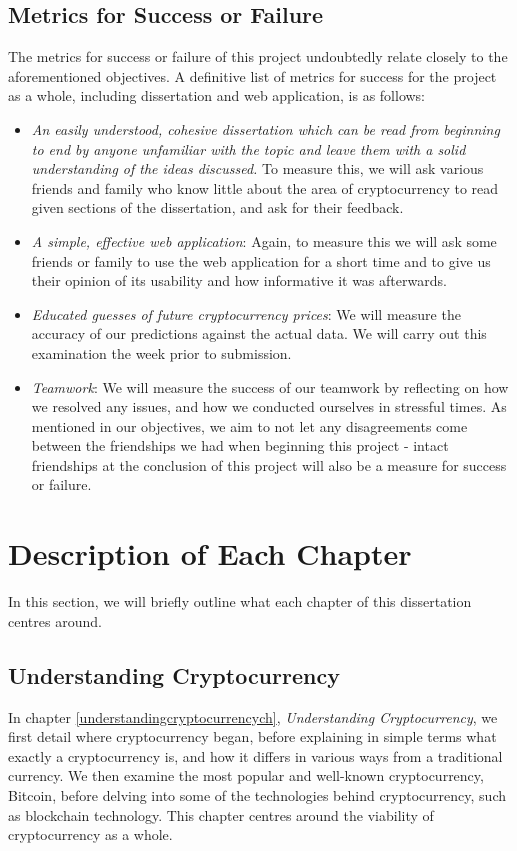 \subsection{Metrics for Success or Failure}\label{metrics}
The metrics for success or failure of this project undoubtedly relate closely to the aforementioned objectives. A definitive list of metrics for success for the project as a whole, including dissertation and web application, is as follows:

\begin{itemize}
    \item\textit{An easily understood, cohesive dissertation which can be read from beginning to end by anyone unfamiliar with the topic and leave them with a solid understanding of the ideas discussed.} To measure this, we will ask various friends and family who know little about the area of cryptocurrency to read given sections of the dissertation, and ask for their feedback.
    \item\textit{A simple, effective web application}: Again, to measure this we will ask some friends or family to use the web application for a short time and to give us their opinion of its usability and how informative it was afterwards.
    \item\textit{Educated guesses of future cryptocurrency prices}: We will measure the accuracy of our predictions against the actual data. We will carry out this examination the week prior to submission.
    \item\textit{Teamwork}: We will measure the success of our teamwork by reflecting on how we resolved any issues, and how we conducted ourselves in stressful times. As mentioned in our objectives, we aim to not let any disagreements come between the friendships we had when beginning this project - intact friendships at the conclusion of this project will also be a measure for success or failure.
\end{itemize}
 
\section{Description of Each Chapter}\label{chdescriptions}
In this section, we will briefly outline what each chapter of this dissertation centres around. 

\subsection{Understanding Cryptocurrency}
In chapter \ref{understandingcryptocurrencych}, \textit{Understanding Cryptocurrency}, we first detail where cryptocurrency began, before explaining in simple terms what exactly a cryptocurrency is, and how it differs in various ways from a traditional currency. We then examine the most popular and well-known cryptocurrency, Bitcoin, before delving into some of the technologies behind cryptocurrency, such as blockchain technology. This chapter centres around the viability of cryptocurrency as a whole. 

